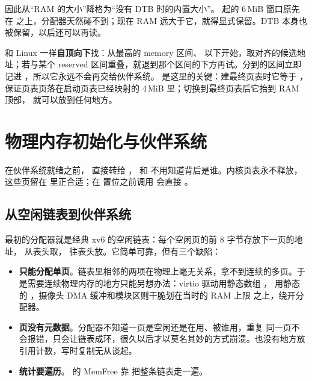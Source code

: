  因此从“RAM 的大小”降格为“没有 DTB 时的内置大小”。 起的 6\,MiB 窗口原先在  之上，分配器天然碰不到；现在 RAM 远大于它，就得显式保留。DTB 本身也被保留，以后还可以再读。

 和 Linux 一样\textbf{自顶向下}找：从最高的 memory 区间、 以下开始，取对齐的候选地址；若与某个 reserved 区间重叠，就退到那个区间的下方再试。分到的区间立即记进 ，所以它永远不会再交给伙伴系统。 是这里的关键：建最终页表时它等于 ，保证页表页落在启动页表已经映射的 4\,MiB 里；切换到最终页表后它抬到 RAM 顶部， 就可以放到任何地方。

\section{物理内存初始化与伙伴系统}
\label{sec:buddy}

在伙伴系统就绪之前， 直接转给 ， 和  不用知道背后是谁。内核页表永不释放，这些页留在  里正合适；在  置位之前调用  会直接 。

\subsection{从空闲链表到伙伴系统}

最初的分配器就是经典 xv6 的空闲链表：每个空闲页的前 8 字节存放下一页的地址， 从表头取， 往表头放。它简单可靠，但有三个缺陷：

\begin{itemize}
  \item \textbf{只能分配单页}。链表里相邻的两项在物理上毫无关系，拿不到连续的多页。于是需要连续物理内存的地方只能另想办法：virtio 驱动用静态数组 ， 用静态的 ，摄像头 DMA 缓冲和模块区则干脆划在当时的 RAM 上限  之上，绕开分配器。
  \item \textbf{页没有元数据}。分配器不知道一页是空闲还是在用、被谁用，重复  同一页不会报错，只会让链表成环，很久以后才以莫名其妙的方式崩溃。也没有地方放引用计数，写时复制无从谈起。
  \item \textbf{统计要遍历}。 的 MemFree 靠  把整条链表走一遍。
\end{itemize}

